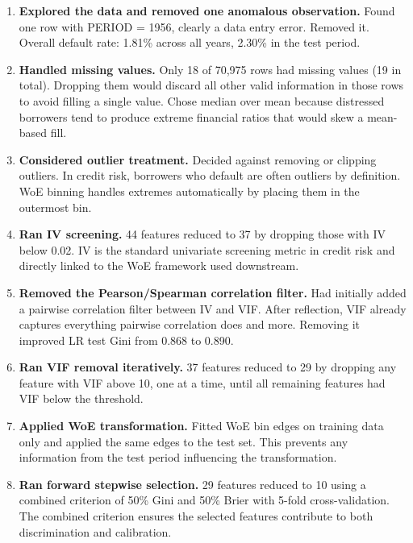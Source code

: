 \documentclass[a4paper,11pt]{article}
\begin{document}
\begin{enumerate}[leftmargin=1.5em, label=\textbf{Step \arabic*.}]
  \item \textbf{Explored the data and removed one anomalous observation.}
        Found one row with PERIOD = 1956, clearly a data entry error. Removed it.
        Overall default rate: 1.81\% across all years, 2.30\% in the test period.

  \item \textbf{Handled missing values.}
        Only 18 of 70{,}975 rows had missing values (19 in total). Dropping them
        would discard all other valid information in those rows to avoid filling a
        single value. Chose median over mean because distressed borrowers tend to
        produce extreme financial ratios that would skew a mean-based fill.

  \item \textbf{Considered outlier treatment.}
        Decided against removing or clipping outliers. In credit risk, borrowers who
        default are often outliers by definition. WoE binning handles extremes
        automatically by placing them in the outermost bin.

  \item \textbf{Ran IV screening.}
        44 features reduced to 37 by dropping those with IV below 0.02. IV is the
        standard univariate screening metric in credit risk and directly linked to
        the WoE framework used downstream.

  \item \textbf{Removed the Pearson/Spearman correlation filter.}
        Had initially added a pairwise correlation filter between IV and VIF. After
        reflection, VIF already captures everything pairwise correlation does and
        more. Removing it improved LR test Gini from 0.868 to 0.890.

  \item \textbf{Ran VIF removal iteratively.}
        37 features reduced to 29 by dropping any feature with VIF above 10, one
        at a time, until all remaining features had VIF below the threshold.

  \item \textbf{Applied WoE transformation.}
        Fitted WoE bin edges on training data only and applied the same edges to the
        test set. This prevents any information from the test period influencing
        the transformation.

  \item \textbf{Ran forward stepwise selection.}
        29 features reduced to 10 using a combined criterion of 50\% Gini and 50\%
        Brier with 5-fold cross-validation. The combined criterion ensures the
        selected features contribute to both discrimination and calibration.


\end{enumerate}
\end{document}
